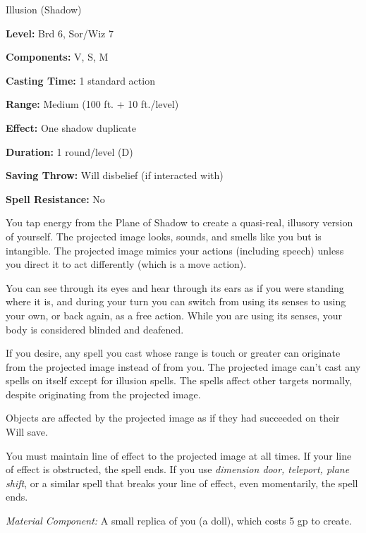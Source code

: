 
Illusion (Shadow)

\textbf{Level:} Brd 6, Sor/Wiz 7

\textbf{Components:} V, S, M

\textbf{Casting Time:} 1 standard action

\textbf{Range:} Medium (100 ft. + 10 ft./level)

\textbf{Effect:} One shadow duplicate

\textbf{Duration:} 1 round/level (D)

\textbf{Saving Throw:} Will disbelief (if interacted with)

\textbf{Spell Resistance:} No

You tap energy from the Plane of Shadow to create a quasi-real, illusory version 
of yourself. The projected image looks, sounds, and smells like you but is intangible. 
The projected image mimics your actions (including speech) unless you direct it 
to act differently (which is a move action).

You can see through its eyes and hear through its ears as if you were standing 
where it is, and during your turn you can switch from using its senses to using 
your own, or back again, as a free action. While you are using its senses, your 
body is considered blinded and deafened.

If you desire, any spell you cast whose range is touch or greater can originate 
from the projected image instead of from you. The projected image can't cast any 
spells on itself except for illusion spells. The spells affect other targets normally, 
despite originating from the projected image.

Objects are affected by the projected image as if they had succeeded on their Will 
save.

You must maintain line of effect to the projected image at all times. If your line 
of effect is obstructed, the spell ends. If you use \textit{dimension door, teleport, 
plane shift}, or a similar spell that breaks your line of effect, even momentarily, 
the spell ends.

\textit{Material Component:} A small replica of you (a doll), which costs 5 gp 
to create.

